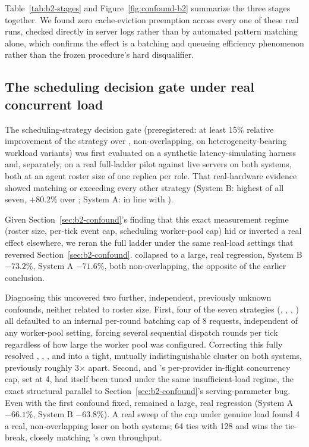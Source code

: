 Table~\ref{tab:b2-stages} and Figure~\ref{fig:confound-b2} summarize the three stages together. We found zero cache-eviction preemption across every one of these real runs, checked directly in server logs rather than by automated pattern matching alone, which confirms the effect is a batching and queueing efficiency phenomenon rather than the frozen procedure's hard disqualifier.

\subsection{The scheduling decision gate under real concurrent load}
\label{sec:scheduler-gate}

The scheduling-strategy decision gate (preregistered: at least 15\% relative improvement of the \Full{} strategy over \CausalOnly{}, non-overlapping, on heterogeneity-bearing workload variants) was first evaluated on a synthetic latency-simulating harness and, separately, on a real full-ladder pilot against live servers on both systems, both at an agent roster size of one replica per role. That real-hardware evidence showed \Full{} matching or exceeding every other strategy (System B: highest of all seven, $+80.2\%$ over \Sequential{}; System A: in line with \CausalOnly{}).

Given Section~\ref{sec:b2-confound}'s finding that this exact measurement regime (roster size, per-tick event cap, scheduling worker-pool cap) hid or inverted a real effect elsewhere, we reran the full ladder under the same real-load settings that reversed Section~\ref{sec:b2-confound}. \Full{} collapsed to a large, real regression, System B $-73.2\%$, System A $-71.6\%$, both non-overlapping, the opposite of the earlier conclusion.

Diagnosing this uncovered two further, independent, previously unknown confounds, neither related to roster size. First, four of the seven strategies (\Barrier{}, \CapabilityAware{}, \QueueAware{}, \Full{}) all defaulted to an internal per-round batching cap of 8 requests, independent of any worker-pool setting, forcing several sequential dispatch rounds per tick regardless of how large the worker pool was configured. Correcting this fully resolved \NaiveConcurrent{}, \Barrier{}, \CausalOnly{}, and \CapabilityAware{} into a tight, mutually indistinguishable cluster on both systems, previously roughly 3$\times$ apart. Second, \QueueAware{} and \Full{}'s per-provider in-flight concurrency cap, set at 4, had itself been tuned under the same insufficient-load regime, the exact structural parallel to Section~\ref{sec:b2-confound}'s serving-parameter bug. Even with the first confound fixed, \Full{} remained a large, real regression (System A $-66.1\%$, System B $-63.8\%$). A real sweep of the cap under genuine load found 4 a real, non-overlapping loser on both systems; 64 ties with 128 and wins the tie-break, closely matching \CausalOnly{}'s own throughput.

